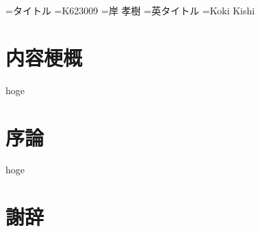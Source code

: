 \documentclass[a4paper,11pt,nomag]{jsreport} %
\begin{document}
{}={タイトル}
={K623009}           %
={岸 孝樹}             %
={英タイトル} %
={Koki Kishi}
\MakeTitle
\newpage
\begin{abstract}\hspace{0.5zw}

\end{abstract}

\chapter*{内容梗概}
\thispagestyle{empty}

hoge

\chapter{序論}
\setcounter{page}{1}

hoge

\chapter*{謝辞}




\tocack
\tocbib
\begin{thebibliography}{99}

\end{thebibliography}
\end{document}
